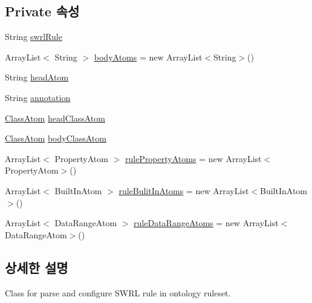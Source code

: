 \subsection*{Private 속성}
\begin{DoxyCompactItemize}
\item 
String \mbox{\hyperlink{classcom_1_1github_1_1aites_1_1framework_1_1rule_1_1_s_w_r_lrule_adde1291a731073840a5ac9e535bf6f3f}{swrl\+Rule}}
\item 
Array\+List$<$ String $>$ \mbox{\hyperlink{classcom_1_1github_1_1aites_1_1framework_1_1rule_1_1_s_w_r_lrule_a83f3d18acd20dd43b8ade45e8c129123}{body\+Atoms}} = new Array\+List$<$String$>$()
\item 
String \mbox{\hyperlink{classcom_1_1github_1_1aites_1_1framework_1_1rule_1_1_s_w_r_lrule_a4ec94c9f7b37610da08df2770f6c6a71}{head\+Atom}}
\item 
String \mbox{\hyperlink{classcom_1_1github_1_1aites_1_1framework_1_1rule_1_1_s_w_r_lrule_af98a0b14045d483b30ad511f0627fe3f}{annotation}}
\item 
\mbox{\hyperlink{classcom_1_1github_1_1aites_1_1framework_1_1rule_1_1_s_w_r_lrule_1_1_class_atom}{Class\+Atom}} \mbox{\hyperlink{classcom_1_1github_1_1aites_1_1framework_1_1rule_1_1_s_w_r_lrule_a687c4ba8bc9724b6a06ab4bb9301ca86}{head\+Class\+Atom}}
\item 
\mbox{\hyperlink{classcom_1_1github_1_1aites_1_1framework_1_1rule_1_1_s_w_r_lrule_1_1_class_atom}{Class\+Atom}} \mbox{\hyperlink{classcom_1_1github_1_1aites_1_1framework_1_1rule_1_1_s_w_r_lrule_a3400b10f602a6a7d7abd42681d7af024}{body\+Class\+Atom}}
\item 
Array\+List$<$ Property\+Atom $>$ \mbox{\hyperlink{classcom_1_1github_1_1aites_1_1framework_1_1rule_1_1_s_w_r_lrule_a4236a432610492bb79e3822eec52fea3}{rule\+Property\+Atoms}} = new Array\+List$<$Property\+Atom$>$()
\item 
Array\+List$<$ Built\+In\+Atom $>$ \mbox{\hyperlink{classcom_1_1github_1_1aites_1_1framework_1_1rule_1_1_s_w_r_lrule_a1ccff2ed582cdf233f27d0127fa2f1c0}{rule\+Bulit\+In\+Atoms}} = new Array\+List$<$Built\+In\+Atom$>$()
\item 
Array\+List$<$ Data\+Range\+Atom $>$ \mbox{\hyperlink{classcom_1_1github_1_1aites_1_1framework_1_1rule_1_1_s_w_r_lrule_a21c0c8ab54dc9ac16131962b01cbea57}{rule\+Data\+Range\+Atoms}} = new Array\+List$<$Data\+Range\+Atom$>$()
\end{DoxyCompactItemize}


\subsection{상세한 설명}
Class for parse and configure S\+W\+RL rule in ontology ruleset. 

